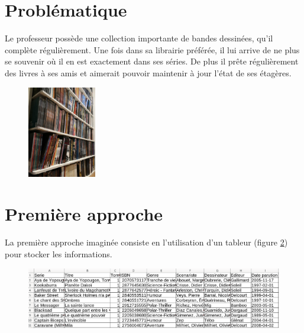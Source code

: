 \documentclass[a4paper,11pt]{article}
\begin{document}
\begin{Form}

\section{Problématique}
Le professeur possède une collection importante de bandes dessinées, qu'il complète régulièrement. Une fois dans sa librairie préférée, il lui arrive de ne plus se souvenir où il en est exactement dans ses séries. De plus il prête régulièrement des livres à ses amis et aimerait pouvoir maintenir à jour l'état de ses étagères.
\begin{figure}[!h]
\centering
\includegraphics[width=3cm]{ressources/biblio.jpg}
\label{biblio}
\end{figure}

\begin{center}
\end{center}
\section{Première approche}
La première approche imaginée consiste en l'utilisation d'un tableur (figure \ref{tableur}) pour stocker les informations.
\begin{figure}[!h]
\centering
\includegraphics[width=15cm]{ressources/approche-1.png}
\label{tableur}
\end{figure}


\end{Form}
\end{document}

